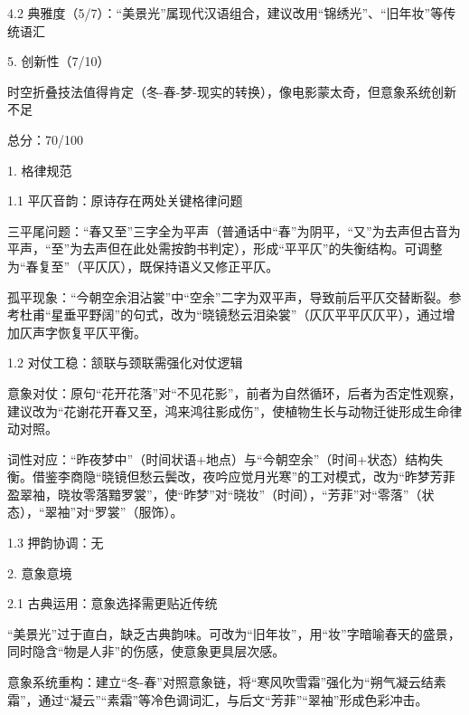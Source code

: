 \begin{tcolorbox}[
  breakable,            %
  colback=white, %
  colframe=black, 
  boxrule=1pt,        %
  arc=0mm             %
  ]
  \hspace{2em}4.2 典雅度（5/7）：“美景光”属现代汉语组合，建议改用“锦绣光”、“旧年妆”等传统语汇\par
  5. 创新性（7/10）\par
  \hspace{2em}时空折叠技法值得肯定（冬-春-梦-现实的转换），像电影蒙太奇，但意象系统创新不足\par
  总分：70/100\par\par
  [改进建议]\par
  1. 格律规范\par
  \hspace{2em}1.1 平仄音韵：原诗存在两处关键格律问题\par
  \hspace{2em}三平尾问题：“春又至”三字全为平声（普通话中“春”为阴平，“又”为去声但古音为平声，“至”为去声但在此处需按韵书判定），形成“平平仄”的失衡结构。可调整为“春复至”（平仄仄），既保持语义又修正平仄。\par
  \hspace{2em}孤平现象：“今朝空余泪沾裳”中“空余”二字为双平声，导致前后平仄交替断裂。参考杜甫“星垂平野阔”的句式，改为“晓镜愁云泪染裳”（仄仄平平仄仄平），通过增加仄声字恢复平仄平衡。\par
  \hspace{2em} 1.2 对仗工稳：颔联与颈联需强化对仗逻辑\par
  \hspace{2em}意象对仗：原句“花开花落”对“不见花影”，前者为自然循环，后者为否定性观察，建议改为“花谢花开春又至，鸿来鸿往影成伤”，使植物生长与动物迁徙形成生命律动对照。\par
  \hspace{2em}词性对应：“昨夜梦中”（时间状语+地点）与“今朝空余”（时间+状态）结构失衡。借鉴李商隐“晓镜但愁云鬓改，夜吟应觉月光寒”的工对模式，改为“昨梦芳菲盈翠袖，晓妆零落黯罗裳”，使“昨梦”对“晓妆”（时间），“芳菲”对“零落”（状态），“翠袖”对“罗裳”（服饰）。\par
  \hspace{2em}1.3 押韵协调：无\par
  2. 意象意境\par
  \hspace{2em}2.1 古典运用：意象选择需更贴近传统\par
  \hspace{2em}“美景光”过于直白，缺乏古典韵味。可改为“旧年妆”，用“妆”字暗喻春天的盛景，同时隐含“物是人非”的伤感，使意象更具层次感。\par
  \hspace{2em}意象系统重构：建立“冬-春”对照意象链，将“寒风吹雪霜”强化为“朔气凝云结素霜”，通过“凝云”“素霜”等冷色调词汇，与后文“芳菲”“翠袖”形成色彩冲击。

\end{tcolorbox}
